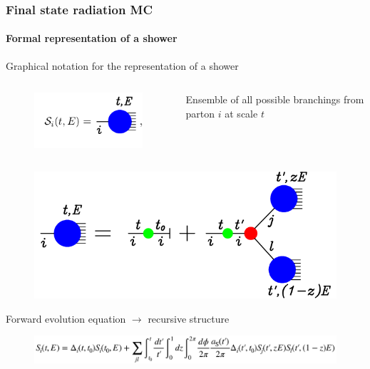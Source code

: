 \documentclass[aspectratio=43]{beamer}
\begin{document}
\begin{frame}

	\frametitle{Final state radiation MC}
	\framesubtitle{Formal representation of a shower}
	
	\footnotesize Graphical notation for the representation of a shower \\
	
	\begin{columns} 
		
		
		\begin{figure}
			\includegraphics[width = 2.5 cm]{plots/shower_1.png}
		\end{figure}

		
		\footnotesize Ensemble of all possible branchings from parton $i$ at scale $t$

	\end{columns}

	\begin{figure}
		\includegraphics[width = 6 cm]{plots/shower_2.png}
	\end{figure}
		
	\footnotesize Forward evolution equation $\rightarrow$ recursive structure
	\begin{figure}
		\includegraphics[width = 10 cm]{plots/shower_2_eq.png}
	\end{figure}

\end{frame}
\end{document}
